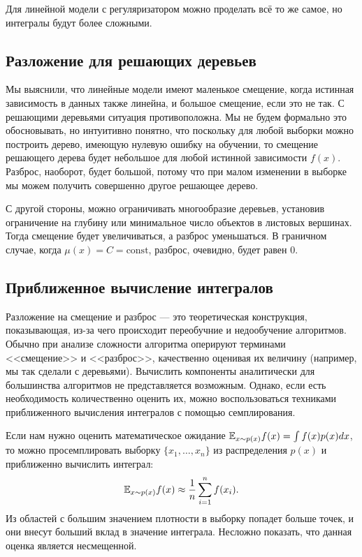 \documentclass[12pt,fleqn]{article}
\begin{document}
Для линейной модели с регуляризатором можно проделать всё то же самое, но интегралы будут более сложными. 

\subsection{Разложение для решающих деревьев}

Мы выяснили, что линейные модели имеют маленькое смещение, когда истинная зависимость в данных также линейна, и большое смещение, если это не так.
С решающими деревьями ситуация противоположна. Мы не будем формально это обосновывать, но интуитивно понятно, что поскольку для любой выборки можно построить дерево, имеющую нулевую ошибку на обучении, то смещение решающего дерева будет небольшое для любой истинной зависимости $f(x)$. Разброс, наоборот, будет большой, потому что при малом изменении в выборке мы можем получить совершенно другое решающее дерево. 

С другой стороны, можно ограничивать многообразие деревьев, установив ограничение на глубину или минимальное число объектов в листовых вершинах. Тогда смещение будет увеличиваться, а разброс уменьшаться. 
В граничном случае, когда $\mu(x) = C = \text{const}$, разброс, очевидно, будет равен 0.
    
\subsection{Приближенное вычисление интегралов}
Разложение на смещение и разброс --- это теоретическая конструкция, показывающая, из-за чего происходит переобучние и недообучение алгоритмов. Обычно при анализе сложности алгоритма оперируют терминами <<смещение>> и <<разброс>>, качественно оценивая их величину (например, мы так сделали с деревьями). Вычислить компоненты аналитически для большинства алгоритмов не представляется возможным. Однако, если есть необходимость количественно оценить их, можно воспользоваться техниками приближенного вычисления интегралов с помощью семплирования.

Если нам нужно оценить математическое ожидание $\mathbb{E}_{x \sim p(x)} f(x) = \int f(x) p(x) dx$, то можно просемплировать выборку $\{x_1, \dots, x_n\}$ из распределения $p(x)$  и приближенно вычислить интеграл:
\[
\mathbb{E}_{x \sim p(x)} f(x) \approx \frac 1 n \sum_{i=1}^n f(x_i).
\]
Из областей с большим значением плотности в выборку попадет больше точек, и они внесут больший вклад в значение интеграла. Несложно показать, что данная оценка является несмещенной.
\end{document}
